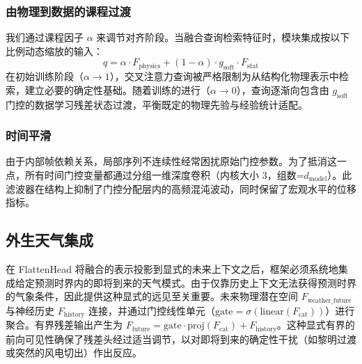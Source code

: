 \subsubsection{由物理到数据的课程过渡}
我们通过课程因子 $\alpha$ 来调节对齐阶段。当融合查询检索特征时，模块集成按以下比例动态缩放的输入：
\begin{equation}
    q = \alpha \cdot F_{\text{physics}} + (1 - \alpha) \cdot g_{\text{soft}} \cdot F_{\text{stat}}
\label{eq:curriculum_query}
\end{equation}
在初始训练阶段（$\alpha \to 1$），交叉注意力查询被严格限制为从结构化物理表示中检索，建立必要的确定性基础。随着训练的进行（$\alpha \to 0$），查询逐渐向包含由 $g_{\text{soft}}$ 门控的数据学习残差状态过渡，平衡既定的物理先验与经验统计适配。

\subsubsection{时间平滑}
由于内部帧依赖关系，局部序列不连续性经常困扰原始门控参数。为了抵消这一点，所有时间门控变量都通过分组一维深度卷积（内核大小 3，组数=$d_{\text{model}}$）。此滤波器在结构上抑制了门控分配层内的高频混沌波动，同时保留了宏观水平的位移指标。

\subsection{外生天气集成}
在 FlattenHead 将融合的表示投影到显式的未来上下文之后，框架必须系统地集成给定预测时界内的即将到来的天气模式。由于仅靠历史上下文无法获得预测时界的气象条件，因此提供这种显式的远见至关重要。未来物理潜在空间 $F_{\text{weather\_future}}$ 与神经历史 $F_{\text{history}}$ 连接，并通过门控线性单元（$\text{gate} = \sigma(\text{linear}(F_{\text{cat}}))$）进行聚合。有界残差输出产生为 $F_{\text{future}} = \text{gate} \cdot \text{proj}(F_{\text{cat}}) + F_{\text{history}}$。这种显式有界的前向可见性确保了残差头经过适当调节，以对即将到来的确定性干扰（如黎明过渡或突然的风电切出）作出反应。

